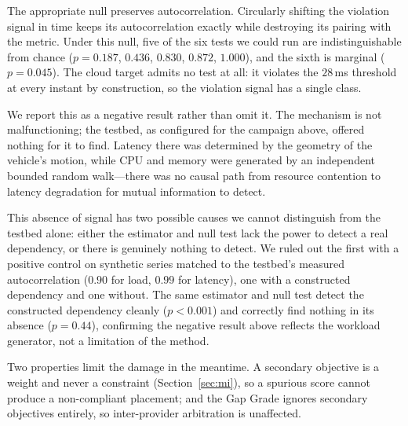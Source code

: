\documentclass[conference]{IEEEtran}
\begin{document}
The appropriate null preserves autocorrelation. Circularly shifting the
violation signal in time keeps its autocorrelation exactly while destroying
its pairing with the metric. Under this null, five of the six tests we could
run are indistinguishable from chance ($p = 0.187$, $0.436$, $0.830$,
$0.872$, $1.000$), and the sixth is marginal ($p = 0.045$). The cloud target
admits no test at all: it violates the $28$\,ms threshold at every instant by
construction, so the violation signal has a single class.

We report this as a negative result rather than omit it. The mechanism is not
malfunctioning; the testbed, as configured for the campaign above, offered
nothing for it to find. Latency there was determined by the geometry of the
vehicle's motion, while CPU and memory were generated by an independent
bounded random walk---there was no causal path from resource contention to
latency degradation for mutual information to detect.

This absence of signal has two possible causes we cannot distinguish from the
testbed alone: either the estimator and null test lack the power to detect a
real dependency, or there is genuinely nothing to detect. We ruled out the
first with a positive control on synthetic series matched to the testbed's
measured autocorrelation ($0.90$ for load, $0.99$ for latency), one with a
constructed dependency and one without. The same estimator and null test
detect the constructed dependency cleanly ($p<0.001$) and correctly find
nothing in its absence ($p=0.44$), confirming the negative result above
reflects the workload generator, not a limitation of the method.

Two properties limit the damage in the meantime. A secondary objective is a
weight and never a constraint (Section~\ref{sec:mi}), so a spurious score
cannot produce a non-compliant placement; and the Gap Grade ignores secondary
objectives entirely, so inter-provider arbitration is unaffected.
\end{document}
